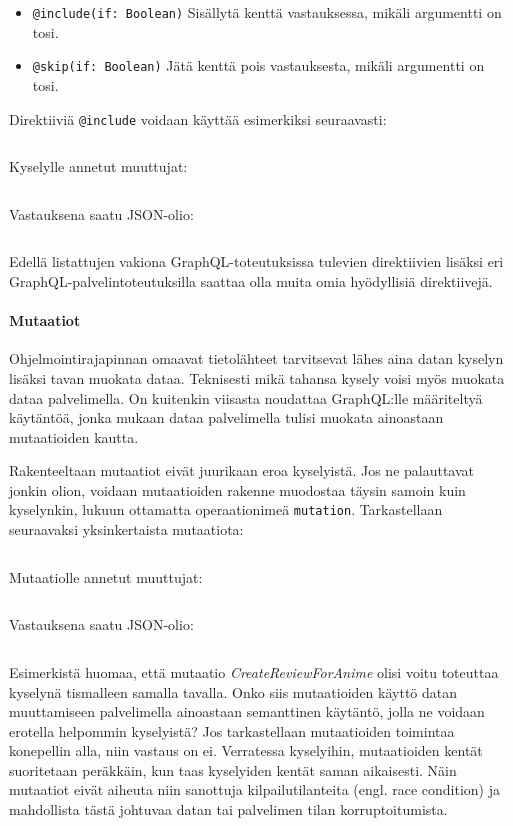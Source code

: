 \begin{itemize}
	\item \texttt{@include(if: Boolean)} Sisällytä kenttä vastauksessa, mikäli argumentti on tosi.
    \item \texttt{@skip(if: Boolean)} Jätä kenttä pois vastauksesta, mikäli argumentti on tosi.
\end{itemize}

Direktiiviä \texttt{@include} voidaan käyttää esimerkiksi seuraavasti:

\inputminted{gql.py:GraphQLLexer -x}{listaukset/directive.graphql}

Kyselylle annetut muuttujat:

\inputminted{json}{listaukset/directive-vars.json}

Vastauksena saatu JSON-olio:

\inputminted{json}{listaukset/directive-res.json}

Edellä listattujen vakiona GraphQL-toteutuksissa tulevien direktiivien lisäksi eri GraphQL-palvelintoteutuksilla saattaa olla muita omia hyödyllisiä direktiivejä. \cite{QueriesAndMutations}

\paragraph{Mutaatiot} Ohjelmointirajapinnan omaavat tietolähteet tarvitsevat lähes aina datan kyselyn lisäksi tavan muokata dataa. Teknisesti mikä tahansa kysely voisi myös muokata dataa palvelimella. On kuitenkin viisasta noudattaa GraphQL:lle määriteltyä käytäntöä, jonka mukaan dataa palvelimella tulisi muokata ainoastaan mutaatioiden kautta. \cite{QueriesAndMutations}

Rakenteeltaan mutaatiot eivät juurikaan eroa kyselyistä. Jos ne palauttavat jonkin olion, voidaan mutaatioiden rakenne muodostaa täysin samoin kuin kyselynkin, lukuun ottamatta operaationimeä \texttt{mutation}. Tarkastellaan seuraavaksi yksinkertaista mutaatiota:

\inputminted{gql.py:GraphQLLexer -x}{listaukset/mutation.graphql}

Mutaatiolle annetut muuttujat:

\inputminted{json}{listaukset/mutation-vars.json}

Vastauksena saatu JSON-olio:

\inputminted{json}{listaukset/mutation-res.json}

Esimerkistä huomaa, että mutaatio \textit{CreateReviewForAnime} olisi voitu toteuttaa kyselynä tismalleen samalla tavalla. Onko siis mutaatioiden käyttö datan muuttamiseen palvelimella ainoastaan semanttinen käytäntö, jolla ne voidaan erotella helpommin kyselyistä? Jos tarkastellaan mutaatioiden toimintaa konepellin alla, niin vastaus on ei. Verratessa kyselyihin, mutaatioiden kentät suoritetaan peräkkäin, kun taas kyselyiden kentät saman aikaisesti. Näin mutaatiot eivät aiheuta niin sanottuja kilpailutilanteita (engl. race condition) ja mahdollista tästä johtuvaa datan tai palvelimen tilan korruptoitumista. \cite{QueriesAndMutations, graphql-spec}

